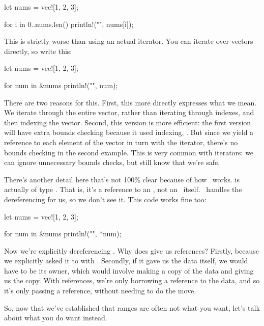 \begin{rustc}
let nums = vec![1, 2, 3];

for i in 0..nums.len() {
    println!("{}", nums[i]);
}
\end{rustc}

This is strictly worse than using an actual iterator. You can iterate over vectors directly, so write this:

\begin{rustc}
let nums = vec![1, 2, 3];

for num in &nums {
    println!("{}", num);
}
\end{rustc}

There are two reasons for this. First, this more directly expresses what we mean. We iterate through the entire vector, rather than 
iterating through indexes, and then indexing the vector. Second, this version is more efficient: the first version will have extra 
bounds checking because it used indexing, . But since we yield a reference to each element of the vector in turn with 
the iterator, there's no bounds checking in the second example. This is very common with iterators: we can ignore unnecessary bounds 
checks, but still know that we're safe.

\blank

There's another detail here that's not 100\% clear because of how \println\ works.  is actually of type . That is, 
it's a reference to an \itt, not an \itt\ itself. \println\ handles the dereferencing for us, so we don't see it. This code works fine too:

\begin{rustc}
let nums = vec![1, 2, 3];

for num in &nums {
    println!("{}", *num);
}
\end{rustc}

Now we're explicitly dereferencing . Why does  give us references? Firstly, because we explicitly asked it to 
with \code{\&}. Secondly, if it gave us the data itself, we would have to be its owner, which would involve making a copy of the data 
and giving us the copy. With references, we're only borrowing a reference to the data, and so it's only passing a reference, without 
needing to do the move.

\blank

So, now that we've established that ranges are often not what you want, let's talk about what you do want instead.

\blank

